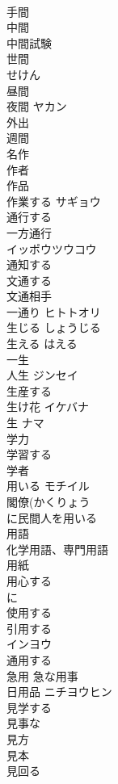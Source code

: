 \documentclass[8pt]{extreport}
\begin{document}
\begin{CJK}{UTF8}{min}
\\	手間	
\\	中間	
\\	中間試験 
\\	世間	
\\	せけん
\\	昼間	
\\	夜間	ヤカン 
\\	外出	
\\	週間	
\\	名作	
\\	作者	
\\	作品	
\\	作業する	サギョウ 
\\	通行する 
\\	一方通行	
\\	イッポウツウコウ 
\\	通知する	
\\	文通する	
\\	文通相手 
\\	一通り	ヒトトオリ 
\\	生じる	しょうじる 
\\	生える	はえる 
\\	一生	
\\	人生	ジンセイ 
\\	生産する	
\\	生け花	イケバナ
\\	生	ナマ 
\\	学力	
\\	学習する	
\\	学者	
\\	用いる	モチイル 
\\	閣僚(かくりょう 
\\	に民間人を用いる 
\\	用語	
\\	化学用語、専門用語
\\	用紙	
\\	用心する	
\\	に
\\	使用する	
\\	引用する	
\\	インヨウ
\\	通用する	
\\	急用	急な用事 
\\	日用品	ニチヨウヒン 
\\	見学する	
\\	見事な	
\\	見方	
\\	見本	
\\	見回る	

\end{CJK}
\end{document}

